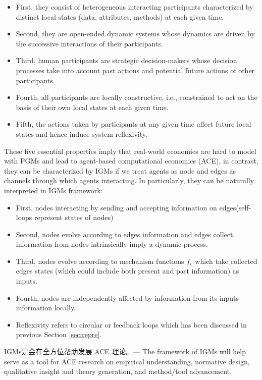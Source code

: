 \documentclass{article}
\theoremstyle{definition}
\theoremstyle{remark}
\theoremstyle{definition}
\begin{document}
\begin{CJK*}{UTF8}{gbsn}
\begin{itemize}
    \item  First, they consist of heterogeneous interacting participants characterized by distinct local states (data, attributes, methods) at each given time. 
    \item Second, they are open-ended dynamic systems whose dynamics are driven by the successive interactions of their participants. 
    \item Third, human participants are strategic decision-makers whose decision processes take into account past actions and potential future actions of other participants. 
    \item Fourth, all participants are locally constructive, i.e., constrained to act on the basis of their own local states at each given time. 
    \item Fifth, the actions taken by participants at any given time affect future local states and hence induce system reflexivity.
\end{itemize}

These five essential properties imply that real-world economies are hard to model with PGMs and lead to agent-based computational economics (ACE)\cite{tesfatsion2006handbook, tesfatsion2002agent}, in contrast, they can be characterized by IGMs if we treat agents as node and edges as channels through which agents interacting. In particularly, they can be naturally interpreted in IGMs framework:

\begin{itemize}
    \item First, nodes interacting by sending and accepting information on edges(self-loops represent states of nodes)
    \item Second, nodes evolve according to edges information and edges collect information from nodes intrinsically imply a dynamic process.
    \item Third, nodes evolve according to mechanism functions $f_v$ which take collected edges states (which could include both present and past information) as inputs.
    \item Fourth, nodes are independently affected by information from its inputs information locally.
    \item Reflexivity refers to circular or feedback loops which has been discussed in previous Section \ref{sec:repre}.
\end{itemize} 


IGMs是会在全方位帮助发展 ACE 理论。---
The framework of IGMs will help serve as a tool for ACE research on empirical understanding, normative design, qualitative insight and theory generation, and method/tool advancement. 







\end{CJK*}
\end{document}
